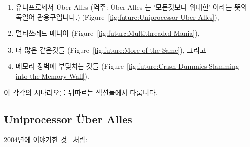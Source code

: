 \begin{enumerate}
\item	유니프로세서 \"Uber Alles (역주: \"Uber Alles 는 '모든것보다
	위대한' 이라는 뜻의 독일어 관용구입니다.)
	(Figure~\ref{fig:future:Uniprocessor Uber Alles}),
\item	멀티쓰레드 매니아
	(Figure~\ref{fig:future:Multithreaded Mania}),
\item	더 많은 같은것들
	(Figure~\ref{fig:future:More of the Same}), 그리고
\item	메모리 장벽에 부딪치는 것들
	(Figure~\ref{fig:future:Crash Dummies Slamming into the Memory Wall}).

\end{enumerate}

이 각각의 시나리오를 뒤따르는 섹션들에서 다룹니다.

\subsection{Uniprocessor \"Uber Alles}
\label{sec:future:Uniprocessor Uber Alles}

2004년에 이야기한 것~\cite{PaulEdwardMcKenneyPhD} 처럼:

